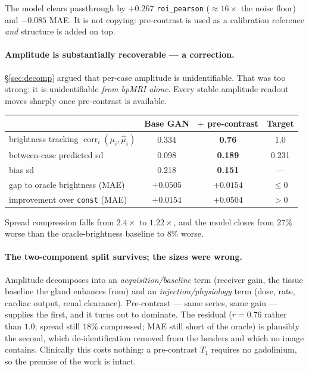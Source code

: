 \documentclass[11pt]{article}
\newcommand{\1}{\mathbb{1}}
\begin{document}
The model clears passthrough by $+0.267$ \texttt{roi\_pearson} ($\approx16\times$ the noise
floor) and $-0.085$ MAE. It is not copying: pre-contrast is used as a calibration reference
\emph{and} structure is added on top.

\paragraph{Amplitude is substantially recoverable --- a correction.}
\S\ref{sec:decomp} argued that per-case amplitude is unidentifiable. That was too strong: it
is unidentifiable \emph{from bpMRI alone}. Every stable amplitude readout moves sharply once
pre-contrast is available.

\begin{center}
\begin{tabular}{lccc}
\toprule
& Base GAN & $+$ pre-contrast & Target \\
\midrule
brightness tracking $\operatorname{corr}_i(\mu_i,\hat\mu_i)$ & 0.334 & \textbf{0.76} & 1.0 \\
between-case predicted sd & 0.098 & \textbf{0.189} & 0.231 \\
bias sd & 0.218 & \textbf{0.151} & --- \\
gap to oracle brightness (MAE) & $+0.0505$ & \textbf{$+0.0154$} & $\le0$ \\
improvement over \texttt{const} (MAE) & $+0.0154$ & \textbf{$+0.0504$} & $>0$ \\
\bottomrule
\end{tabular}
\end{center}

Spread compression falls from $2.4\times$ to $1.22\times$, and the model closes from $27\%$
worse than the oracle-brightness baseline to $8\%$ worse.

\paragraph{The two-component split survives; the sizes were wrong.} Amplitude decomposes
into an \emph{acquisition/baseline} term (receiver gain, the tissue baseline the gland
enhances from) and an \emph{injection/physiology} term (dose, rate, cardiac output, renal
clearance). Pre-contrast --- same series, same gain --- supplies the first, and it turns out
to dominate. The residual ($r=0.76$ rather than $1.0$; spread still $18\%$ compressed; MAE
still short of the oracle) is plausibly the second, which de-identification removed from the
headers and which no image contains. Clinically this costs nothing: a pre-contrast $T_1$
requires no gadolinium, so the premise of the work is intact.
\end{document}
